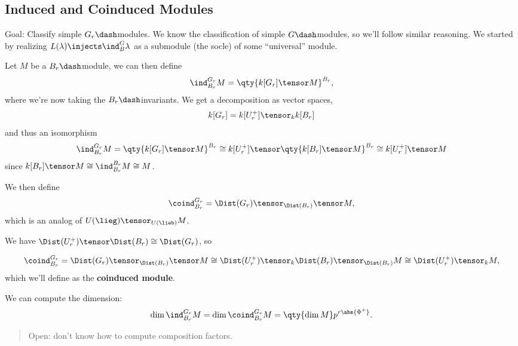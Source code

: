 \hypertarget{induced-and-coinduced-modules}{%
\subsection{Induced and Coinduced
Modules}\label{induced-and-coinduced-modules}}

Goal: Classify simple \(G_r\dash\)modules. We know the classification of
simple \(G\dash\)modules, so we'll follow similar reasoning. We started
by realizing \(L(\lambda) \injects \ind_B^G \lambda\) as a submodule
(the socle) of some ``universal'' module.

Let \(M\) be a \(B_r\dash\)module, we can then define
\begin{align*}  
\ind_{B_r}^{G_r}M = \qty{k[G_r] \tensor M }^{B_r}
,\end{align*} where we're now taking the \(B_r\dash\)invariants. We get
a decomposition as vector spaces,
\begin{align*}  
k[G_r] = k[U_r^+] \tensor_k k[B_r]
\end{align*} and thus an isomorphism
\begin{align*}  
\ind_{B_r}^{G_r}M = \qty{k[G_r] \tensor M }^{B_r} 
\cong k[U_r^+] \tensor \qty{ k[B_r] \tensor M}^{B_r}
\cong k[U_r^+] \tensor M
\end{align*} since \(k[B_r]\tensor M \cong \ind_{B_r}^{B_r} M \cong M\).

We then define
\begin{align*}  
\coind_{B_r}^{G_r} = \Dist(G_r) \tensor_{\Dist(B_r)} \tensor M
,\end{align*} which is an analog of \(U(\lieg)\tensor_{U(\lieb)} M\).

We have \(\Dist(U_r^+) \tensor \Dist(B_r) \cong \Dist(G_r)\), so

\begin{align*}  
\coind_{B_r}^{G_r} = \Dist(G_r) \tensor_{\Dist(B_r)} \tensor M
\cong
\Dist(U_r^+) \tensor_k \Dist(B_r) \tensor_{\Dist(B_r)} M 
\cong
\Dist(U_r^+) \tensor_k M
,\end{align*} which we'll define as the \textbf{coinduced module}.

We can compute the dimension:
\begin{align*}  
\dim \ind_{B_r}^{G_r} M = \dim \coind_{B_r}^{G_r} M = \qty{\dim M} p^{r\abs{\Phi^+}}
.\end{align*}

\begin{quote}
Open: don't know how to compute composition factors.
\end{quote}

